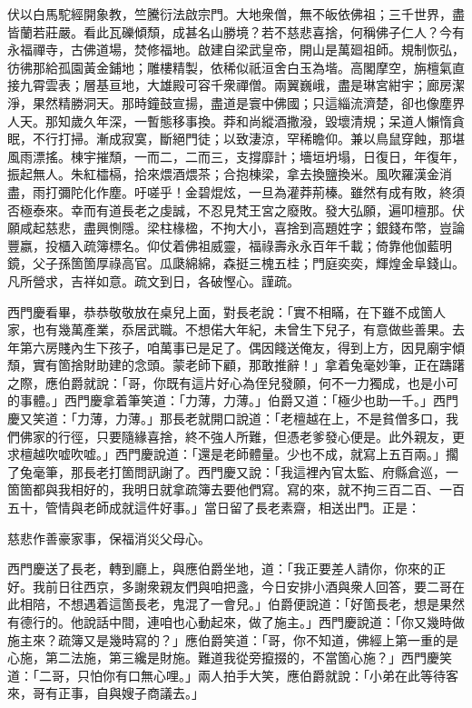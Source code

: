 \begin{myquote}[\markfont]
伏以白馬駝經開象教，竺騰衍法啟宗門。大地衆僧，無不皈依佛祖；三千世界，盡皆蘭若莊嚴。看此瓦礫傾頹，成甚名山勝境？若不慈悲喜捨，何稱佛子仁人？今有永福禪寺，古佛道場，焚修福地。啟建自梁武皇帝，開山是萬廻祖師。規制恢弘，彷彿那給孤園黃金鋪地；雕樓精製，依稀似祇洹舍白玉為堦。高閣摩空，旃檀氣直接九霄雲表；層基亘地，大雄殿可容千衆禪僧。兩翼巍峨，盡是琳宮紺宇；廊房潔淨，果然精勝洞天。那時鐘鼓宣揚，盡道是寰中佛國；只這緇流濟楚，卻也像塵界人天。那知歲久年深，一暫態移事換。莽和尚縱酒撒潑，毀壞清規；呆道人懶惰貪眠，不行打掃。{}漸成寂寞，斷絕門徒；以致淒涼，罕稀瞻仰。兼以鳥鼠穿蝕，那堪風雨漂搖。棟宇摧頹，一而二，二而三，支撐靡計；墻垣坍塌，日復日，年復年，振起無人。朱紅櫺槅，拾來煨酒煨茶；合抱棟梁，拿去換鹽換米。風吹羅漢金消盡，雨打彌陀化作塵。吁嗟乎！金碧焜炫，一旦為灌莽荊榛。雖然有成有敗，終須否極泰來。幸而有道長老之虔誠，不忍見梵王宮之廢敗。發大弘願，遍叩檀那。伏願咸起慈悲，盡興惻隱。梁柱椽楹，不拘大小，喜捨到高題姓字；銀錢布幣，豈論豐嬴，投櫃入疏簿標名。仰仗着佛祖威靈，福祿壽永永百年千載；倚靠他伽藍明鏡，父子孫箇箇厚祿高官。瓜瓞綿綿，森挺三槐五桂；門庭奕奕，輝煌金阜錢山。凡所營求，吉祥如意。疏文到日，各破慳心。謹疏。
\end{myquote}

西門慶看畢，恭恭敬敬放在桌兒上面，對長老說：「實不相瞞，在下雖不成箇人家，也有幾萬產業，{}忝居武職。不想偌大年紀，未曾生下兒子，有意做些善果。去年第六房賤內生下孩子，咱萬事已是足了。偶因餞送俺友，得到上方，因見廟宇傾頹，實有箇捨財助建的念頭。蒙老師下顧，那敢推辭！」拿着兔毫妙筆，正在躊躇之際，應伯爵就說：「哥，你既有這片好心為侄兒發願，何不一力獨成，{}也是小可的事體。」西門慶拿着筆笑道：「力薄，力薄。」伯爵又道：「極少也助一千。」西門慶又笑道：「力薄，力薄。」那長老就開口說道：「老檀越在上，不是貧僧多口，我們佛家的行徑，只要隨緣喜捨，終不強人所難，但憑老爹發心便是。此外親友，更求檀越吹嘘吹嘘。」西門慶說道：「還是老師體量。少也不成，就寫上五百兩。」擱了兔毫筆，那長老打箇問訊謝了。西門慶又說：「我這裡內官太監、府縣倉巡，一箇箇都與我相好的，我明日就拿疏簿去要他們寫。寫的來，就不拘三百二百、一百五十，管情與老師成就這件好事。」當日留了長老素齋，相送出門。正是：

\begin{myquote}
慈悲作善豪家事，保福消災父母心。
\end{myquote}

西門慶送了長老，轉到廳上，與應伯爵坐地，道：「我正要差人請你，你來的正好。我前日往西京，多謝衆親友們與咱把盞，今日安排小酒與衆人回答，要二哥在此相陪，不想遇着這箇長老，鬼混了一會兒。」伯爵便說道：「好箇長老，想是果然有德行的。他說話中間，連咱也心動起來，做了施主。」西門慶說道：「你又幾時做施主來？疏簿又是幾時寫的？」{}應伯爵笑道：「哥，你不知道，佛經上第一重的是心施，第二法施，第三纔是財施。難道我從旁攛掇的，不當箇心施？」{}西門慶笑道：「二哥，只怕你有口無心哩。」兩人拍手大笑，應伯爵就說：「小弟在此等待客來，哥有正事，自與嫂子商議去。」

